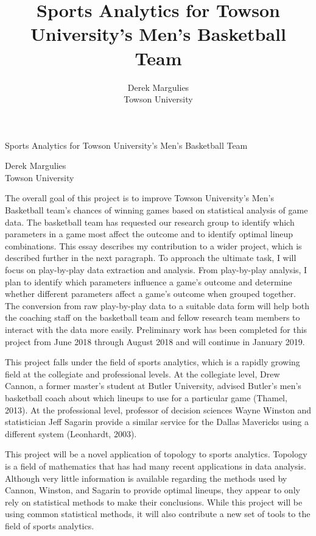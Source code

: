 \documentclass[12pt, letterpaper]{article}
\title{Sports Analytics for Towson University's Men's Basketball Team}
\author{Derek Margulies \\ Towson University}
\date{}
\begin{document}
\begin{center}
{\LARGE Sports Analytics for Towson University's Men's Basketball Team} \\
\vspace{12pt}

{\large Derek Margulies \\ \large Towson University}
\end{center}

The overall goal of this project is to improve Towson University’s Men’s Basketball team’s chances of winning games based on statistical analysis of game data. The basketball team has requested our research group to identify which parameters in a game most affect the outcome and to identify optimal lineup combinations. This essay describes my contribution to a wider project, which is described further in the next paragraph. To approach the ultimate task, I will focus on play-by-play data extraction and analysis. From play-by-play analysis, I plan to identify which parameters influence a game’s outcome and determine whether different parameters affect a game’s outcome when grouped together. The conversion from raw play-by-play data to a suitable data form will help both the coaching staff on the basketball team and fellow research team members to interact with the data more easily. Preliminary work has been completed for this project from June 2018 through August 2018 and will continue in January 2019.

This project falls under the field of sports analytics, which is a rapidly growing field at the collegiate and professional levels. At the collegiate level, Drew Cannon, a former master’s student at Butler University, advised Butler’s men’s basketball coach about which lineups to use for a particular game (Thamel, 2013). At the professional level, professor of decision sciences Wayne Winston and statistician Jeff Sagarin provide a similar service for the Dallas Mavericks using a different system (Leonhardt, 2003). 

This project will be a novel application of topology to sports analytics. Topology is a field of mathematics that has had many recent applications in data analysis. Although very little information is available regarding the methods used by Cannon, Winston, and Sagarin to provide optimal lineups, they appear to only rely on statistical methods to make their conclusions. While this project will be using common statistical methods, it will also contribute a new set of tools to the field of sports analytics.
\end{document}
